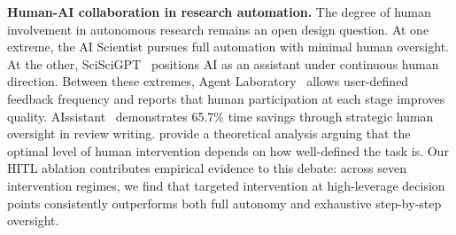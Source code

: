 \noindent \textbf{Human-AI collaboration in research automation.}
The degree of human involvement in autonomous research remains an open design question. At one extreme, the AI Scientist pursues full automation with minimal human oversight. At the other, SciSciGPT~\citep{shao2025sciscigpt} positions AI as an assistant under continuous human direction. Between these extremes, Agent Laboratory~\citep{schmidgall2025agentlab} allows user-defined feedback frequency and reports that human participation at each stage improves quality. AIssistant~\citep{gaddipati2025aissistant} demonstrates 65.7\% time savings through strategic human oversight in review writing. \citet{natarajan2024hitl} provide a theoretical analysis arguing that the optimal level of human intervention depends on how well-defined the task is. Our HITL ablation contributes empirical evidence to this debate: across seven intervention regimes, we find that targeted intervention at high-leverage decision points consistently outperforms both full autonomy and exhaustive step-by-step oversight.

